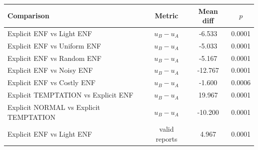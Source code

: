 \begin{tabular}{p{4.8cm}ccc}
\toprule
Comparison & Metric & Mean diff & $p$ \\
\midrule
Explicit ENF vs Light ENF & $u_B-u_A$ & -6.533 & 0.0001 \\
Explicit ENF vs Uniform ENF & $u_B-u_A$ & -5.033 & 0.0001 \\
Explicit ENF vs Random ENF & $u_B-u_A$ & -5.167 & 0.0001 \\
Explicit ENF vs Noisy ENF & $u_B-u_A$ & -12.767 & 0.0001 \\
Explicit ENF vs Costly ENF & $u_B-u_A$ & -1.600 & 0.0006 \\
Explicit TEMPTATION vs Explicit ENF & $u_B-u_A$ & 19.967 & 0.0001 \\
Explicit NORMAL vs Explicit TEMPTATION & $u_B-u_A$ & -10.200 & 0.0001 \\
Explicit ENF vs Light ENF & valid reports & 4.967 & 0.0001 \\
\bottomrule
\end{tabular}